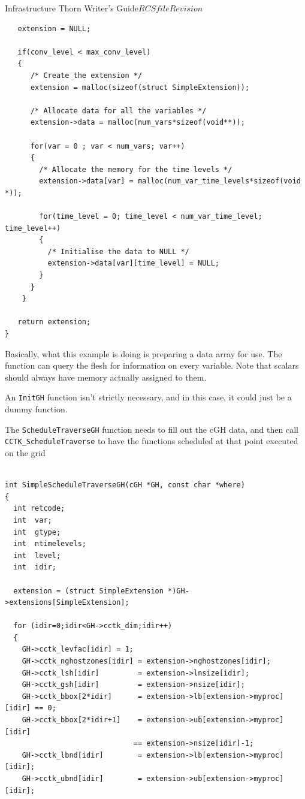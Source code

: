 \begin{cactuspart}{Infrastructure Thorn Writer's Guide}{$RCSfile$}{$Revision$}
\begin{verbatim}
   extension = NULL;

   if(conv_level < max_conv_level)
   {
      /* Create the extension */
      extension = malloc(sizeof(struct SimpleExtension));

      /* Allocate data for all the variables */
      extension->data = malloc(num_vars*sizeof(void**));

      for(var = 0 ; var < num_vars; var++)
      {
        /* Allocate the memory for the time levels */
        extension->data[var] = malloc(num_var_time_levels*sizeof(void *));

        for(time_level = 0; time_level < num_var_time_level; time_level++)
        {
          /* Initialise the data to NULL */
          extension->data[var][time_level] = NULL;
        }
      }
    }

   return extension;
}

\end{verbatim}

Basically, what this example is doing is preparing a data array for use.  The
function can query the flesh for information on every variable.  Note that
scalars should always have memory actually assigned to them.

An {\tt InitGH} function isn't strictly necessary, and in this case, it could
just be a dummy function.

The {\tt ScheduleTraverseGH} function needs to fill out the cGH data, and
then call {\tt CCTK\_ScheduleTraverse} to have the functions scheduled at
that point executed on the grid

\begin{verbatim}

int SimpleScheduleTraverseGH(cGH *GH, const char *where)
{
  int retcode;
  int  var;
  int  gtype;
  int  ntimelevels;
  int  level;
  int  idir;

  extension = (struct SimpleExtension *)GH->extensions[SimpleExtension];

  for (idir=0;idir<GH->cctk_dim;idir++)
  {
    GH->cctk_levfac[idir] = 1;
    GH->cctk_nghostzones[idir] = extension->nghostzones[idir];
    GH->cctk_lsh[idir]         = extension->lnsize[idir];
    GH->cctk_gsh[idir]         = extension->nsize[idir];
    GH->cctk_bbox[2*idir]      = extension->lb[extension->myproc][idir] == 0;
    GH->cctk_bbox[2*idir+1]    = extension->ub[extension->myproc][idir]
                              == extension->nsize[idir]-1;
    GH->cctk_lbnd[idir]        = extension->lb[extension->myproc][idir];
    GH->cctk_ubnd[idir]        = extension->ub[extension->myproc][idir];


\end{verbatim}
\end{cactuspart}
